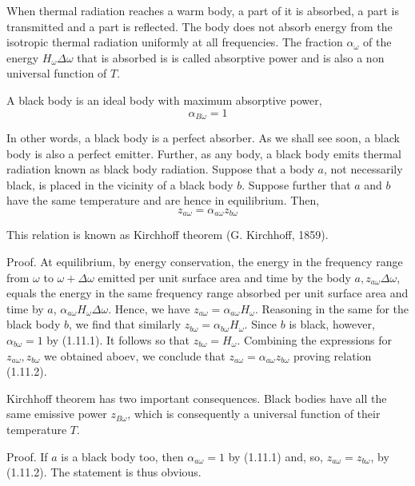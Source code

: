 \documentclass{article}
\begin{document}
When thermal radiation reaches a warm body, a part of it is absorbed, a part is transmitted and a part is reflected. The body does not absorb energy from the isotropic thermal radiation uniformly at all frequencies. The fraction $\alpha_{\omega}$ of the energy $H_{\omega} \Delta \omega$ that is absorbed is is called absorptive power and is also a non universal function of $T$.

A black body is an ideal body with maximum absorptive power,
$$
\begin{equation*}
\alpha_{B \omega}=1 \tag{1.11.1}
\end{equation*}
$$

In other words, a black body is a perfect absorber. As we shall see soon, a black body is also a perfect emitter. Further, as any body, a black body emits thermal
radiation known as black body radiation.
Suppose that a body $a$, not necessarily black, is placed in the vicinity of a black body $b$. Suppose further that $a$ and $b$ have the same temperature and are hence in equilibrium. Then,
$$
\begin{equation*}
z_{a \omega}=\alpha_{a \omega} z_{b \omega} \tag{1.11.2}
\end{equation*}
$$

This relation is known as Kirchhoff theorem (G. Kirchhoff, 1859).

Proof. At equilibrium, by energy conservation, the energy in the frequency range from $\omega$ to $\omega+\Delta \omega$ emitted per unit surface area and time by the body $a, z_{a \omega} \Delta \omega$, equals the energy in the same frequency range absorbed per unit surface area and time by $a$, $\alpha_{a \omega} H_{\omega} \Delta \omega$. Hence, we have $z_{a \omega}=\alpha_{a \omega} H_{\omega}$. Reasoning in the same for the black body $b$, we find that similarly $z_{b \omega}=\alpha_{b \omega} H_{\omega}$. Since $b$ is black, however, $\alpha_{b \omega}=1$ by (1.11.1). It follows so that $z_{b \omega}=H_{\omega}$. Combining the expressions for $z_{a \omega}, z_{b \omega}$ we obtained aboev, we conclude that $z_{a \omega}=\alpha_{a \omega} z_{b \omega}$ proving relation (1.11.2).

Kirchhoff theorem has two important consequences.
Black bodies have all the same emissive power $z_{B \omega}$, which is consequently a universal function of their temperature $T$.

Proof. If $a$ is a black body too, then $\alpha_{a \omega}=1$ by (1.11.1) and, so, $z_{a \omega}=z_{b \omega}$, by (1.11.2). The statement is thus obvious.
\end{document}
